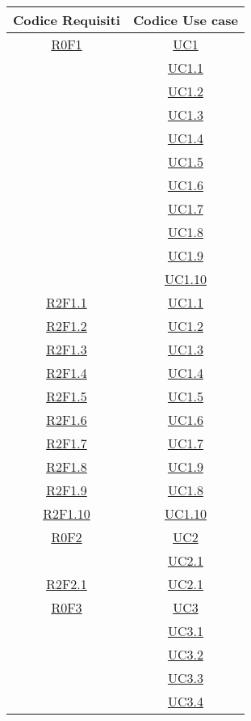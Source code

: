 \normalsize
\begin{longtable}{|c|c|}
\hline
\textbf{Codice Requisiti} & \textbf{Codice Use case} \\
\hline
\endhead
\hyperlink{R0F1}{R0F1} & \hyperlink{UC1}{UC1}\\
& \hyperlink{UC1.1}{UC1.1}\\
& \hyperlink{UC1.2}{UC1.2}\\
& \hyperlink{UC1.3}{UC1.3}\\
& \hyperlink{UC1.4}{UC1.4}\\
& \hyperlink{UC1.5}{UC1.5}\\
& \hyperlink{UC1.6}{UC1.6}\\
& \hyperlink{UC1.7}{UC1.7}\\
& \hyperlink{UC1.8}{UC1.8}\\
& \hyperlink{UC1.9}{UC1.9}\\
& \hyperlink{UC1.10}{UC1.10}\\
\hline
\hyperlink{R2F1.1}{R2F1.1} & \hyperlink{UC1.1}{UC1.1}\\
\hline
\hyperlink{R2F1.2}{R2F1.2} & \hyperlink{UC1.2}{UC1.2}\\
\hline
\hyperlink{R2F1.3}{R2F1.3} & \hyperlink{UC1.3}{UC1.3}\\
\hline
\hyperlink{R2F1.4}{R2F1.4} & \hyperlink{UC1.4}{UC1.4}\\
\hline
\hyperlink{R2F1.5}{R2F1.5} & \hyperlink{UC1.5}{UC1.5}\\
\hline
\hyperlink{R2F1.6}{R2F1.6} & \hyperlink{UC1.6}{UC1.6}\\
\hline
\hyperlink{R2F1.7}{R2F1.7} & \hyperlink{UC1.7}{UC1.7}\\
\hline
\hyperlink{R2F1.8}{R2F1.8} & \hyperlink{UC1.9}{UC1.9}\\
\hline
\hyperlink{R2F1.9}{R2F1.9} & \hyperlink{UC1.8}{UC1.8}\\
\hline
\hyperlink{R2F1.10}{R2F1.10} & \hyperlink{UC1.10}{UC1.10}\\
\hline
\hyperlink{R0F2}{R0F2} & \hyperlink{UC2}{UC2}\\
& \hyperlink{UC2.1}{UC2.1}\\
\hline
\hyperlink{R2F2.1}{R2F2.1} & \hyperlink{UC2.1}{UC2.1}\\
\hline
\hyperlink{R0F3}{R0F3} & \hyperlink{UC3}{UC3}\\
& \hyperlink{UC3.1}{UC3.1}\\
& \hyperlink{UC3.2}{UC3.2}\\
& \hyperlink{UC3.3}{UC3.3}\\
& \hyperlink{UC3.4}{UC3.4}\\

\end{longtable}
